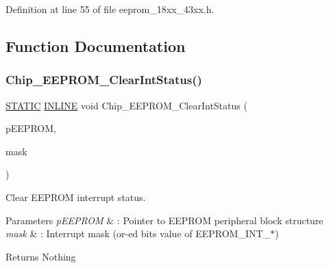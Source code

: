 Definition at line 55 of file eeprom\+\_\+18xx\+\_\+43xx.\+h.



\subsection{Function Documentation}
\mbox{\label{group___e_e_p_r_o_m__18_x_x__43_x_x_gae551204eb5e0c647ea853bc3a19aa33c}} 
\subsubsection{\texorpdfstring{Chip\+\_\+\+E\+E\+P\+R\+O\+M\+\_\+\+Clear\+Int\+Status()}{Chip\_EEPROM\_ClearIntStatus()}}
{\footnotesize\ttfamily \hyperlink{group___l_p_c___types___public___macros_ga10b2d890d871e1489bb02b7e70d9bdfb}{S\+T\+A\+T\+IC} \hyperlink{spifi__18xx__43xx_8h_a2eb6f9e0395b47b8d5e3eeae4fe0c116}{I\+N\+L\+I\+NE} void Chip\+\_\+\+E\+E\+P\+R\+O\+M\+\_\+\+Clear\+Int\+Status (\begin{DoxyParamCaption}\item[{\hyperlink{struct_l_p_c___e_e_p_r_o_m___t}{L\+P\+C\+\_\+\+E\+E\+P\+R\+O\+M\+\_\+T} $\ast$}]{p\+E\+E\+P\+R\+OM,  }\item[{uint32\+\_\+t}]{mask }\end{DoxyParamCaption})}



Clear E\+E\+P\+R\+OM interrupt status. 


\begin{DoxyParams}{Parameters}
{\em p\+E\+E\+P\+R\+OM} & \+: Pointer to E\+E\+P\+R\+OM peripheral block structure \\
\hline
{\em mask} & \+: Interrupt mask (or-\/ed bits value of E\+E\+P\+R\+O\+M\+\_\+\+I\+N\+T\+\_\+$\ast$) \\
\hline
\end{DoxyParams}
\begin{DoxyReturn}{Returns}
Nothing 
\end{DoxyReturn}


